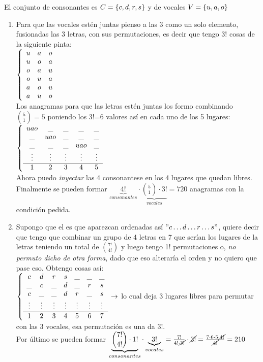 El conjunto de consonantes es $C = \left\{ c,d,r,s \right\}$ y de vocales $V = \left\{ u,a,o \right\}$
\begin{enumerate}[label=\roman*)]
	\item  Para que las vocales estén juntas pienso a las 3 como un solo elemento, fusionadas las 3 letras, con sus permutaciones,
	      es decir que tengo 3! cosas de la siguiente pinta:\\
	      $\llave{c c c} %
		      {
			      u & a & o\\
			      u & o & a\\
			      o & a & u\\
			      o & u & a\\
			      a & o & u\\
			      a & u & o\\
		      } $\\
	      Los anagramas para que las letras estén juntas los formo combinando $\binom{5}{1} = 5$ poniendo los 3!=6 valores así en cada uno de los
	      5 lugares:\\
	      $\llave{c c c c c} %
		      {
			      uao & \_ & \_ & \_ & \_\\
			      \_& uao  & \_ & \_ & \_\\
			      \_ & \_ & \_ & uao &  \_\\
			      \vdots & \vdots & \vdots & \vdots & \vdots \\ \hline
			      1 & 2 & 3 & 4 & 5
		      } $\\
	      Ahora puedo \textit{inyectar} las 4 consonantese en los 4 lugares que quedan libres. Finalmente se pueden formar
	      $\underbrace{4!}_{consonantes} \cdot \underbrace{ \binom{5}{1} \cdot 3!}_{vocales} =  720$ anagramas con la condición pedida.\\

	\item Supongo que el  es que aparezcan ordenadas así $"c \dots d \dots r \dots s"$, quiere decir que tengo que combinar
	      un grupo de 4 letras en 7 que serían los lugares de la letras teniendo un total de $\binom{7!}{4!}$ y luego tengo 1! permutaciones o, \textit{no permuto
		      dicho de otra forma},    dado que eso alteraría el orden y no quiero que pase eso. Obtengo cosas así:\\
	      $\llave{c c c c c c c c} %
		      {
			      c & d & r & s &\_ & \_ & \_\\
			      \_ & c & \_ & d & \_ & r & s\\
			      c & \_ & \_ & d & r & \_ & s\\
			      \vdots & \vdots &\vdots & \vdots & \vdots & \vdots & \vdots \\ \hline
			      1 & 2 & 3 & 4 & 5 & 6 & 7
		      } \to
	      $ lo cual deja 3 lugares libres para permutar con las 3 vocales, esa permutación es una  da $3!$.\\
	      Por último se pueden formar $\underbrace{\binom{7!}{4!}\cdot 1!}_{consonantes} \cdot \underbrace{3!}_{vocales} =
		      \frac{7!}{4!\cdot \cancel{3!}} \cdot \cancel{3!} = \frac{7 \cdot 6 \cdot 5 \cdot \cancel{4!}}{\cancel{4!}} = 210$



\end{enumerate}
